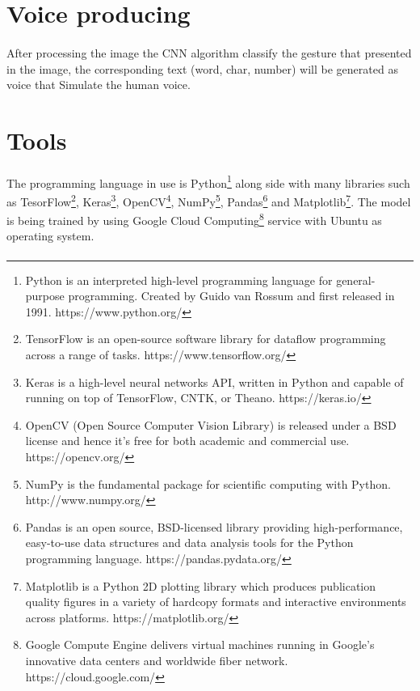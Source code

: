 \documentclass[12pt]{report}
\begin{document}
                    
                    \newpage

        \section{Voice producing}
        \paragraph{}
            After processing the image the CNN algorithm classify the gesture
            that presented in the image, the corresponding text (word, char, number)
            will be generated as voice that Simulate the human voice. 
        
        \section{Tools}
        \paragraph{}
            The programming language in use is Python\footnote{Python is an interpreted high-level programming language for general-purpose programming. Created by Guido van Rossum and first released in 1991. https://www.python.org/} along side with many
            libraries such as TesorFlow\footnote{TensorFlow is an open-source software library for dataflow programming across a range of tasks. https://www.tensorflow.org/},
            Keras\footnote{Keras is a high-level neural networks API, written in Python and capable of running on top of TensorFlow, CNTK, or Theano. https://keras.io/}, 
            OpenCV\footnote{OpenCV (Open Source Computer Vision Library) is released under a BSD license and hence it’s free for both academic and commercial use. https://opencv.org/}, 
            NumPy\footnote{NumPy is the fundamental package for scientific computing with Python. http://www.numpy.org/}, 
            Pandas\footnote{Pandas is an open source, BSD-licensed library providing high-performance, easy-to-use data structures and data analysis tools for the Python programming language. https://pandas.pydata.org/}
            and Matplotlib\footnote{Matplotlib is a Python 2D plotting library which produces publication quality figures in a variety of hardcopy formats and interactive environments across platforms. https://matplotlib.org/}.
            The model is being trained by using Google Cloud Computing\footnote{Google Compute Engine delivers virtual machines running in Google's innovative data centers and worldwide fiber network. https://cloud.google.com/} service with Ubuntu as operating system.
        
        \paragraph{}

        
    
\end{document}
